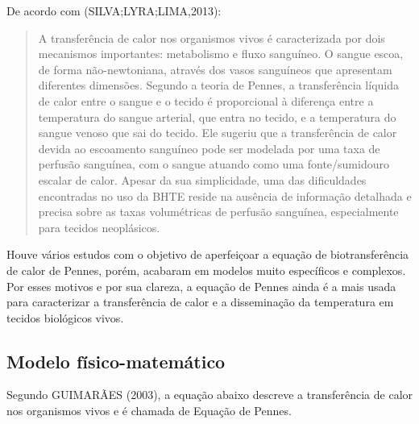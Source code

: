       De acordo com (SILVA;LYRA;LIMA,2013):
 \begin{quotation}
     
       A transferência de calor nos organismos vivos é caracterizada por dois mecanismos importantes: metabolismo e fluxo sanguíneo. O sangue escoa, de forma não-newtoniana, através dos vasos sanguíneos que apresentam diferentes dimensões. Segundo a teoria de Pennes, a transferência líquida de calor entre o sangue e o tecido é proporcional à diferença entre a temperatura do sangue arterial, que entra no tecido, e a temperatura do sangue venoso que sai do tecido. Ele sugeriu que a transferência de calor devida ao escoamento sanguíneo pode ser modelada por uma taxa de perfusão sanguínea, com o sangue atuando como uma fonte/sumidouro escalar de calor. Apesar da sua simplicidade, uma das dificuldades encontradas no uso da BHTE reside na ausência de informação detalhada e precisa sobre as taxas volumétricas de perfusão sanguínea, especialmente para tecidos neoplásicos.\end{quotation}

      Houve vários estudos com o objetivo de aperfeiçoar a equação de biotransferência de calor de Pennes, porém, acabaram em modelos muito específicos e complexos. Por esses motivos e por sua clareza, a equação de Pennes ainda é a mais usada para caracterizar a transferência de calor e a disseminação da temperatura em tecidos biológicos vivos.




 \subsection{Modelo físico-matemático}

    Segundo GUIMARÃES (2003), a equação abaixo descreve a transferência de calor nos organismos vivos e é chamada de Equação de Pennes.



